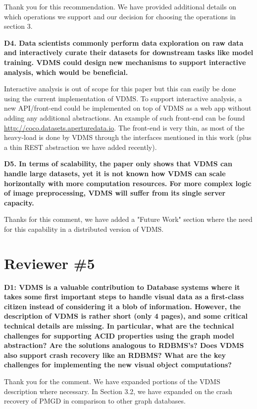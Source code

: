 \documentclass[11pt]{proposalnsf}
\begin{document}
Thank you for this recommendation.
We have provided additional details on which operations we support and our
decision for choosing the operations in section 3.

\bigskip
\noindent %
\textbf{
D4. Data scientists commonly perform data exploration on raw data and interactively
curate their datasets for downstream tasks like model training.
VDMS could design new mechanisms to support interactive analysis,
which would be beneficial.
}\bigskip

Interactive analysis is out of scope for this paper but this can easily be done
using the current implementation of VDMS.
To support interactive analysis, a new API/front-end could be implemented on top of
VDMS as a web app without adding any additional abstractions.
An example of such front-end can be found \url{http://coco.datasets.aperturedata.io}.
The front-end is very thin, as most of the heavy-load is done by VDMS through
the interfaces mentioned in this work
(plus a thin REST abstraction we have added recently).

\bigskip
\noindent %
\textbf{
D5. In terms of scalability, the paper only shows that VDMS can handle large
datasets, yet it is not known how VDMS can scale horizontally with more
computation resources.
For more complex logic of image preprocessing, VDMS will suffer from its
single server capacity.
}\bigskip

Thanks for this comment, we have added a "Future Work" section where the need
for this capability in a distributed version of VDMS.

\newpage
\section{Reviewer \#5}

\noindent %
\textbf{
D1: VDMS is a valuable contribution to Database systems where it takes
some first important steps to handle visual data as a first-class citizen
instead of considering it a blob of information. However, the description
of VDMS is rather short (only 4 pages), and some critical technical
details are missing. In particular, what are the technical challenges
for supporting ACID properties using the graph model abstraction? Are
the solutions analogous to RDBMS’s? Does VDMS also support crash
recovery like an RDBMS? What are the key challenges for implementing
the new visual object computations?
}\bigskip

Thank you for the comment.
We have expanded portions of the VDMS description where necessary.
In Section 3.2, we have expanded on the crash recovery of PMGD in
comparison to other graph databases.
\end{document}
